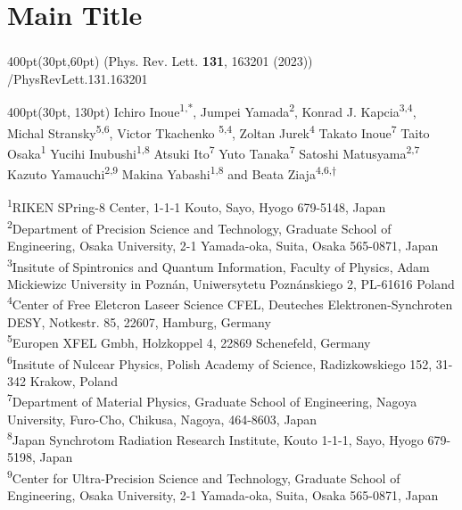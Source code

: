 \section{Main Title}
\begin{frame}
\frametitle{}
\framesubtitle{}

\small
\begin{textblock*}{400pt}(30pt,60pt)
\small (Phys. Rev. Lett. \textbf{131}, 163201 (2023)) \\
/PhysRevLett.131.163201
\end{textblock*}

\begin{textblock*}{400pt}(30pt, 130pt)
\centering\footnotesize
Ichiro Inoue\textsuperscript{1,*},
Jumpei Yamada\textsuperscript{2},
Konrad J. Kapcia\textsuperscript{3,4},
Michal Stransky\textsuperscript{5,6},
Victor Tkachenko \textsuperscript{5,4},
Zoltan Jurek\textsuperscript{4}
Takato Inoue\textsuperscript{7}
Taito Osaka\textsuperscript{1}
Yucihi Inubushi\textsuperscript{1,8}
Atsuki Ito\textsuperscript{7}
Yuto Tanaka\textsuperscript{7}
Satoshi Matusyama\textsuperscript{2,7}
Kazuto Yamauchi\textsuperscript{2,9}
Makina Yabashi\textsuperscript{1,8}
and Beata Ziaja\textsuperscript{4,6,$\dagger$}

\vspace{10pt}
\tiny
\textsuperscript{1}RIKEN SPring-8 Center, 
1-1-1 Kouto, Sayo, Hyogo 679-5148, Japan  \\
\textsuperscript{2}Department of Precision Science and Technology,
Graduate School of Engineering, Osaka University,
2-1 Yamada-oka, Suita, Osaka 565-0871, Japan \\
\textsuperscript{3}Insitute of Spintronics and Quantum Information,
Faculty of Physics, Adam Mickiewizc University in Pozn\'an,
Uniwersytetu Pozn\'anskiego 2, PL-61616 Poland\\
\textsuperscript{4}Center of Free Eletcron Laseer Science CFEL, Deuteches 
Elektronen-Synchroten DESY, Notkestr. 85, 22607, Hamburg, Germany\\
\textsuperscript{5}Europen XFEL Gmbh, Holzkoppel 4, 22869 Schenefeld, Germany\\
\textsuperscript{6}Insitute of Nulcear Physics, Polish Academy of Science,
Radizkowskiego 152, 31-342 Krakow, Poland\\
\textsuperscript{7}Department of Material Physics, 
Graduate School of Engineering, Nagoya University, 
Furo-Cho, Chikusa, Nagoya, 464-8603, Japan\\
\textsuperscript{8}Japan Synchrotom Radiation Research Institute, Kouto 1-1-1,
Sayo, Hyogo 679-5198, Japan\\
\textsuperscript{9}Center for Ultra-Precision Science and Technology, 
Graduate School of Engineering, Osaka University, 2-1 Yamada-oka, Suita, 
Osaka 565-0871, Japan
\end{textblock*}


\end{frame}
